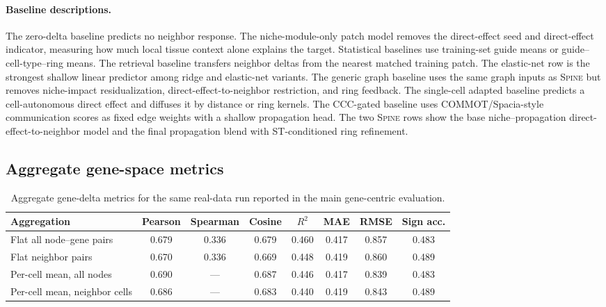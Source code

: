 \documentclass[sigconf,review,balance=false]{acmart}
\newcommand{\methodname}{\textsc{Spine}\xspace}
\begin{document}
\paragraph{Baseline descriptions.}
The zero-delta baseline predicts no neighbor response. The niche-module-only patch model removes the direct-effect seed and direct-effect indicator, measuring how much local tissue context alone explains the target. Statistical baselines use training-set guide means or guide--cell-type--ring means. The retrieval baseline transfers neighbor deltas from the nearest matched training patch. The elastic-net row is the strongest shallow linear predictor among ridge and elastic-net variants. The generic graph baseline uses the same graph inputs as \methodname{} but removes niche-impact residualization, direct-effect-to-neighbor restriction, and ring feedback. The single-cell adapted baseline predicts a cell-autonomous direct effect and diffuses it by distance or ring kernels. The CCC-gated baseline uses COMMOT/Spacia-style communication scores as fixed edge weights with a shallow propagation head. The two \methodname{} rows show the base niche--propagation direct-effect-to-neighbor model and the final propagation blend with ST-conditioned ring refinement.

\subsection{Aggregate gene-space metrics}
\label{app:gene_space_metrics}

\begin{table}[t]
\centering
\caption{Aggregate gene-delta metrics for the same real-data run reported in the main gene-centric evaluation.}
\label{tab:app_gene_delta_metrics}
\small
\setlength{\tabcolsep}{5pt}
\renewcommand{\arraystretch}{1.12}
\begin{tabular}{lccccccc}
\toprule
Aggregation & Pearson & Spearman & Cosine & $R^2$ & MAE & RMSE & Sign acc. \\
\midrule
Flat all node--gene pairs & 0.679 & 0.336 & 0.679 & 0.460 & 0.417 & 0.857 & 0.483 \\
Flat neighbor pairs & 0.670 & 0.336 & 0.669 & 0.448 & 0.419 & 0.860 & 0.489 \\
Per-cell mean, all nodes & 0.690 & --- & 0.687 & 0.446 & 0.417 & 0.839 & 0.483 \\
Per-cell mean, neighbor cells & 0.686 & --- & 0.683 & 0.440 & 0.419 & 0.843 & 0.489 \\
\bottomrule
\end{tabular}
\end{table}
\end{document}
